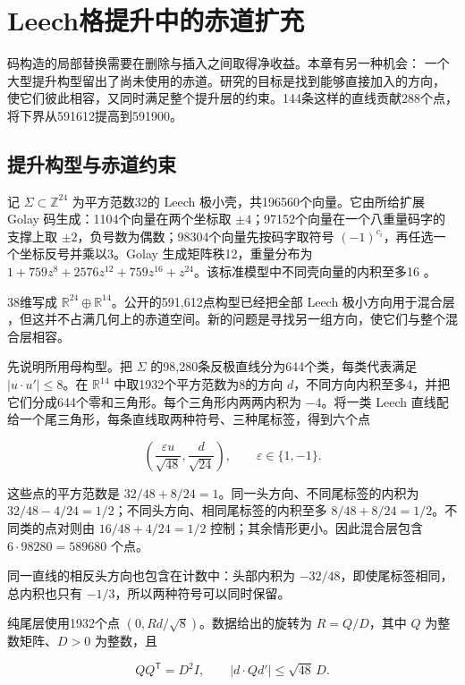 \section{Leech格提升中的赤道扩充}
\label{sec:equatorial}

码构造的局部替换需要在删除与插入之间取得净收益。本章有另一种机会：
一个大型提升构型留出了尚未使用的赤道。研究的目标是找到能够直接加入的方向，
使它们彼此相容，又同时满足整个提升层的约束。144条这样的直线贡献288个点，
将下界从591612提高到591900。

\subsection{提升构型与赤道约束}

记 \(\Sigma\subset\mathbb Z^{24}\) 为平方范数32的 Leech
极小壳，共196560个向量。它由所给扩展 Golay
码生成：1104个向量在两个坐标取
\(\pm4\)；97152个向量在一个八重量码字的支撑上取
\(\pm2\)，负号数为偶数；98304个向量先按码字取符号
\((-1)^{c_i}\)，再任选一个坐标反号并乘以3。Golay
生成矩阵秩12，重量分布为
\(1+759z^8+2576z^{12}+759z^{16}+z^{24}\)。该标准模型中不同壳向量的内积至多16
\cite{conway1999sphere}。

38维写成
\(\mathbb R^{24}\oplus\mathbb R^{14}\)。公开的591,612点构型已经把全部
Leech 极小方向用于混合层
\cite{kissingnumbers}，但这并不占满几何上的赤道空间。新的问题是寻找另一组方向，使它们与整个混合层相容。

先说明所用母构型。把 \(\Sigma\)
的98,280条反极直线分为644个类，每类代表满足 \(|u\cdot u'|\le8\)。在
\(\mathbb R^{14}\) 中取1932个平方范数为8的方向
\(d\)，不同方向内积至多4，并把它们分成644个零和三角形。每个三角形内两两内积为
\(-4\)。将一类 Leech
直线配给一个尾三角形，每条直线取两种符号、三种尾标签，得到六个点

\[
\left(\frac{\varepsilon u}{\sqrt{48}},\frac d{\sqrt{24}}\right),
\qquad \varepsilon\in\{1,-1\}.
\]

这些点的平方范数是 \(32/48+8/24=1\)。同一头方向、不同尾标签的内积为
\(32/48-4/24=1/2\)；不同头方向、相同尾标签的内积至多
\(8/48+8/24=1/2\)。不同类的点对则由 \(16/48+4/24=1/2\)
控制；其余情形更小。因此混合层包含 \(6\cdot98280=589680\) 个点。

同一直线的相反头方向也包含在计数中：头部内积为 $-32/48$，即使尾标签相同，
总内积也只有 $-1/3$，所以两种符号可以同时保留。

纯尾层使用1932个点 \((0,Rd/\sqrt8)\)。数据给出的旋转为 \(R=Q/D\)，其中
\(Q\) 为整数矩阵、\(D>0\) 为整数，且

\[
QQ^{\mathsf T}=D^2I,
\qquad |d\cdot Qd'|\le\sqrt{48}\,D.
\]

